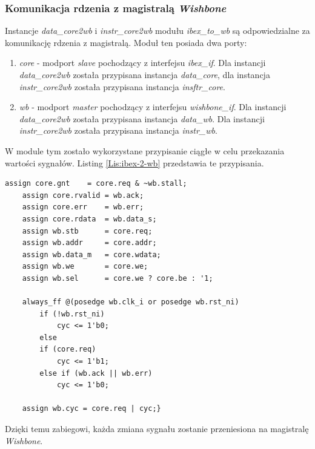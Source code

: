 \documentclass[11pt,a4paper]{article}
\begin{document}
		\subsubsection{Komunikacja rdzenia z magistralą \textit{Wishbone}}
\hspace{5mm}
Instancje \textit{data\_core2wb} i \textit{instr\_core2wb} modułu \textit{ibex\_to\_wb} są odpowiedzialne za komunikację rdzenia z magistralą. Moduł ten posiada dwa porty:
\begin{enumerate}
	\item \textit{core} - modport \textit{slave} pochodzący z interfejsu \textit{ibex\_if}. Dla instancji \textit{data\_core2wb} została przypisana instancja \textit{data\_core}, dla instancja \textit{instr\_core2wb} została przypisana instancja \textit{insftr\_core}.
	\item \textit{wb} - modport \textit{master} pochodzący z interfejsu \textit{wishbone\_if}. Dla instancji \textit{data\_core2wb} została przypisana instancja \textit{data\_wb}. Dla instancji \textit{instr\_core2wb} została przypisana instancja \textit{instr\_wb}.
\end{enumerate}
W module tym zostało wykorzystane przypisanie ciągłe w celu przekazania wartości sygnałów. Listing \ref{Lis:ibex-2-wb} przedstawia te przypisania.\\
\begin{minipage}{\textwidth}
\begin{scriptsize}
\begin{lstlisting}[label=Lis:ibex-2-wb,caption=Przypisanie ciągłe modułu \it ibex\_to\_wb]
	assign core.gnt    = core.req & ~wb.stall;
	assign core.rvalid = wb.ack;
	assign core.err    = wb.err;
	assign core.rdata  = wb.data_s;
	assign wb.stb      = core.req;
	assign wb.addr     = core.addr;
	assign wb.data_m   = core.wdata;
	assign wb.we       = core.we;
	assign wb.sel      = core.we ? core.be : '1;

	always_ff @(posedge wb.clk_i or posedge wb.rst_ni)
		if (!wb.rst_ni)
			cyc <= 1'b0;
		else
		if (core.req)
			cyc <= 1'b1;
		else if (wb.ack || wb.err)
			cyc <= 1'b0;

	assign wb.cyc = core.req | cyc;}
\end{lstlisting}

\end{scriptsize}
\end{minipage}
Dzięki temu zabiegowi, każda zmiana sygnału zostanie przeniesiona na magistralę \textit{Wishbone}.
\end{document}

